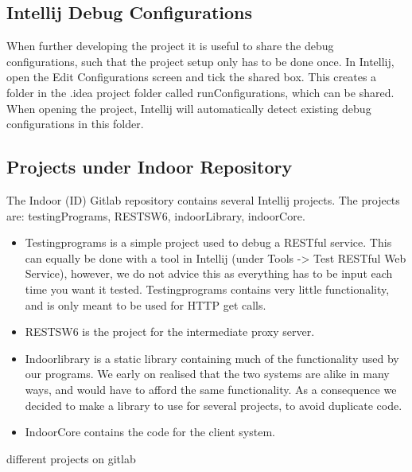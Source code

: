 \subsection*{Intellij Debug Configurations}
When further developing the project it is useful to share the debug configurations, such that the project setup only has to be done once. In Intellij, open the Edit Configurations screen and tick the shared box. This creates a folder in the .idea project folder called runConfigurations, which can be shared. When opening the project, Intellij will automatically detect existing debug configurations in this folder.


\subsection*{Projects under Indoor Repository}
The Indoor (ID) Gitlab repository contains several Intellij projects. The projects are: testingPrograms, RESTSW6, indoorLibrary, indoorCore.
\begin{itemize}

\item Testingprograms is a simple project used to debug a RESTful service. This can equally be done with a tool in Intellij (under Tools -> Test RESTful Web Service), however, we do not advice this as everything has to be input each time you want it tested. Testingprograms contains very little functionality, and is only meant to be used for HTTP get calls.
\item RESTSW6 is the project for the intermediate proxy server. 
\item Indoorlibrary is a static library containing much of the functionality used by our programs. We early on realised that the two systems are alike in many ways, and would have to afford the same functionality. As a consequence we decided to make a library to use for several projects, to avoid duplicate code. 
\item IndoorCore contains the code for the client system. 

\end{itemize} 

 
different projects on gitlab